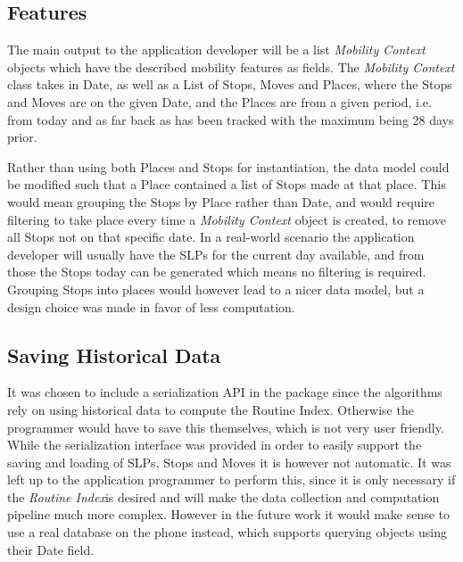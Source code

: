 \subsection{Features}
The main output to the application developer will be a list \textit{Mobility Context} objects which have the described mobility features as fields. The \textit{Mobility Context} class takes in Date, as well as a List of Stops, Moves and Places, where the Stops and Moves are on the given Date, and the Places are from a given period, i.e. from today and as far back as has been tracked with the maximum being 28 days prior. 

Rather than using both Places and Stops for instantiation, the data model could be modified such that a Place contained a list of Stops made at that place. This would mean grouping the Stops by Place rather than Date, and would require filtering to take place every time a \textit{Mobility Context} object is created, to remove all Stops not on that specific date. In a real-world scenario the application developer will usually have the SLPs for the current day available, and from those the Stops today can be generated which means no filtering is required. Grouping Stops into places would however lead to a nicer data model, but a design choice was made in favor of less computation. 

\subsection{Saving Historical Data}
It was chosen to include a serialization API in the package since the algorithms rely on using historical data to compute the Routine Index. Otherwise the programmer would have to save this themselves, which is not very user friendly. While the serialization interface was provided in order to easily support the saving and loading of SLPs, Stops and Moves it is however not automatic. It was left up to the application programmer to perform this, since it is only necessary if the \textit{Routine Index}is desired and will make the data collection and computation pipeline much more complex. However in the future work it would make sense to use a real database on the phone instead, which supports querying objects using their Date field. 